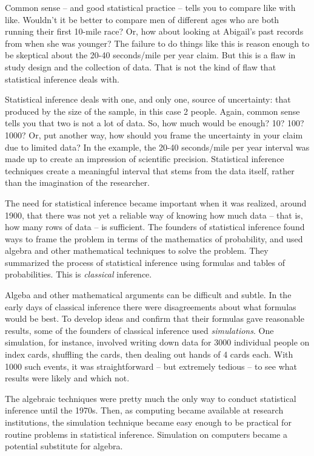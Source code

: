\documentclass[]{book}
\begin{document}
Common sense -- and good statistical practice -- tells you to compare like with like. Wouldn't it be better to compare men of different ages who are both running their first 10-mile race? Or, how about looking at Abigail's past records from when she was younger? The failure to do things like this is reason enough to be skeptical about the 20-40 seconds/mile per year claim. But this is a flaw in study design and the collection of data. That is not the kind of flaw that statistical inference deals with.

Statistical inference deals with one, and only one, source of uncertainty: that produced by the size of the sample, in this case 2 people. Again, common sense tells you that two is not a lot of data. So, how much would be enough? 10? 100? 1000? Or, put another way, how should you frame the uncertainty in your claim due to limited data? In the example, the 20-40 seconds/mile per year interval was made up to create an impression of scientific precision. Statistical inference techniques create a meaningful interval that stems from the data itself, rather than the imagination of the researcher.

The need for statistical inference became important when it was realized, around 1900, that there was not yet a reliable way of knowing how much data -- that is, how many rows of data -- is sufficient. The founders of statistical inference found ways to frame the problem in terms of the mathematics of probability, and used algebra and other mathematical techniques to solve the problem. They summarized the process of statistical inference using formulas and tables of probabilities. This is \emph{classical} inference.

Algeba and other mathematical arguments can be difficult and subtle. In the early days of classical inference there were disagreements about what formulas would be best. To develop ideas and confirm that their formulas gave reasonable results, some of the founders of classical inference used \emph{simulations}. One simulation, for instance, involved writing down data for 3000 individual people on index cards, shuffling the cards, then dealing out hands of 4 cards each. With 1000 such events, it was straightforward -- but extremely tedious -- to see what results were likely and which not.

The algebraic techniques were pretty much the only way to conduct statistical inference until the 1970s. Then, as computing became available at research institutions, the simulation technique became easy enough to be practical for routine problems in statistical inference. Simulation on computers became a potential substitute for algebra.
\end{document}
